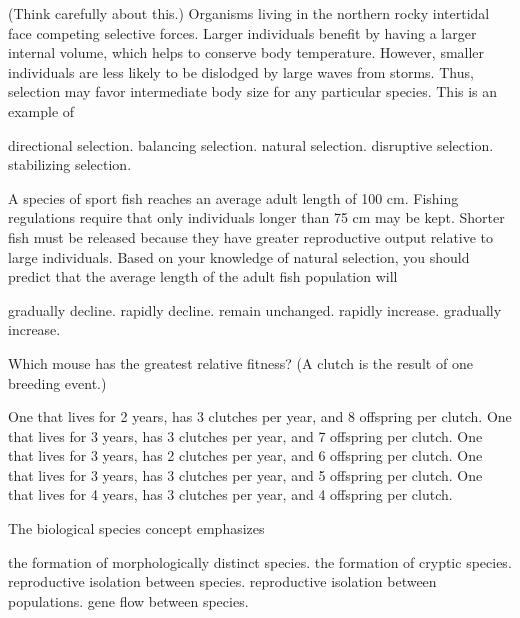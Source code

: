 \question
(Think carefully about this.) Organisms living in the northern rocky intertidal face competing selective forces. Larger individuals benefit by having a larger internal volume, which helps to conserve body temperature. However, smaller individuals are less likely to be dislodged by large waves from storms. Thus, selection may favor intermediate body size for any particular species. This is an example of

\begin{choices}
\choice directional selection. 
\correctchoice balancing selection. 
\choice natural selection. 
\choice disruptive selection. 
\choice stabilizing selection. 
\end{choices}

\question
A species of sport fish reaches an average adult length of 100 cm. Fishing regulations require that only individuals longer than 75 cm may be kept. Shorter fish must be released because they have greater reproductive output relative to large individuals. Based on your knowledge of natural selection, you should predict that the average length of the adult fish population will

\begin{choices}
\choice gradually decline. 
\choice rapidly decline. 
\correctchoice remain unchanged. 
\choice rapidly increase. 
\choice gradually increase. 
\end{choices}

\question
Which mouse has the greatest relative fitness? (A clutch is the result of one breeding event.)

\begin{choices}
\choice One that lives for 2 years, has 3 clutches per year, and 8 offspring per clutch. 
\correctchoice One that lives for 3 years, has 3 clutches per year, and 7 offspring per clutch. 
\choice One that lives for 3 years, has 2 clutches per year, and 6 offspring per clutch. 
\choice One that lives for 3 years, has 3 clutches per year, and 5 offspring per clutch.
\choice One that lives for 4 years, has 3 clutches per year, and 4 offspring per clutch.
\end{choices}

\question
The biological species concept emphasizes

\begin{choices}
\choice the formation of morphologically distinct species.
\choice the formation of cryptic species.
\correctchoice reproductive isolation between species.
\choice reproductive isolation between populations.
\choice gene flow between species.
\end{choices}

